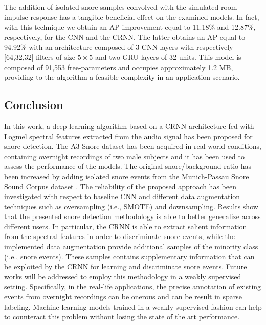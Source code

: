 The addition of isolated snore samples convolved with the simulated room impulse response has a tangible beneficial effect on the examined models. In fact, with this technique we obtain an AP improvement equal to 11.18\% and 12.87\%, respectively, for the CNN and the CRNN. The latter obtains an AP equal to 94.92\% with an architecture composed of 3 CNN layers with respectively [64,32,32] filters of size $5\times5$ and two GRU layers of 32 units.
This model is composed of 91,553 free-parameters and occupies approximately 1.2 MB, providing to the algorithm a feasible complexity in an application scenario.


\subsection{Conclusion}
In this work, a deep learning algorithm based on a CRNN architecture fed with Logmel spectral features extracted from the audio signal has been proposed for snore detection. The A3-Snore dataset has been acquired in real-world conditions, containing overnight recordings of two male subjects and it has been used to assess the performance of the models. The original snore/background ratio has been increased by adding isolated snore events from the Munich-Passau Snore Sound Corpus dataset \cite{ComParE2017}. The reliability of the proposed approach has been investigated with respect to baseline CNN and different data augmentation techniques such as oversampling (i.e., SMOTE) and downsampling. Results show that the presented snore detection methodology is able to better generalize across different users. In particular, the CRNN is able to extract salient information from the spectral features in order to discriminate snore events, while the implemented data augmentation provide additional samples of the minority class (i.e., snore events). These samples contains supplementary information that can be exploited by the CRNN for learning and discriminate snore events.
Future works will be addressed to employ this methodology in a weakly supervised setting.
Specifically, in the real-life applications, the precise annotation of existing events from overnight recordings can be onerous and can be result in sparse labeling. Machine learning models trained in a weakly supervised fashion can help to counteract this problem without losing the state of the art performance.

\newpage

